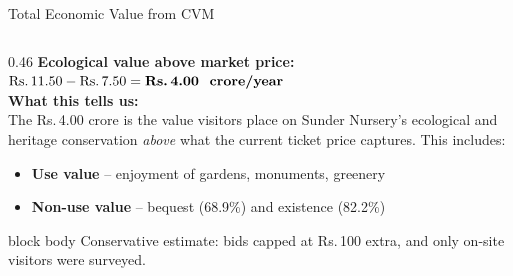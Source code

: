 \documentclass[10pt, aspectratio=169]{beamer}
\newcommand{\rupee}{\textrm{Rs.}\,}
\newcommand{\keyinsight}[1]{%
  \begin{beamercolorbox}[wd=\textwidth, sep=6pt, rounded=true]{block body}
    {\small #1}
  \end{beamercolorbox}%
}
\begin{document}
\begin{frame}[shrink=5]{Total Economic Value from CVM}
\begin{columns}[T]
\begin{column}{0.46\textwidth}
            \textbf{Ecological value above market price:}\\
            $\text{\rupee}11.50 - \text{\rupee}7.50 = \textbf{\rupee 4.00 \text{ crore/year}}$\\[8pt]
            \textbf{What this tells us:}\\
            The \rupee 4.00 crore is the value visitors place on Sunder Nursery's ecological and heritage conservation \textit{above} what the current ticket price captures. This includes:
            \begin{itemize}
                \item \textbf{Use value} -- enjoyment of gardens, monuments, greenery
                \item \textbf{Non-use value} -- bequest (68.9\%) and existence (82.2\%)
            \end{itemize}

            \vspace{0.2em}
            \keyinsight{Conservative estimate: bids capped at \rupee 100 extra, and only on-site visitors were surveyed.}
        \end{column}
    \end{columns}
\end{frame}
\end{document}
